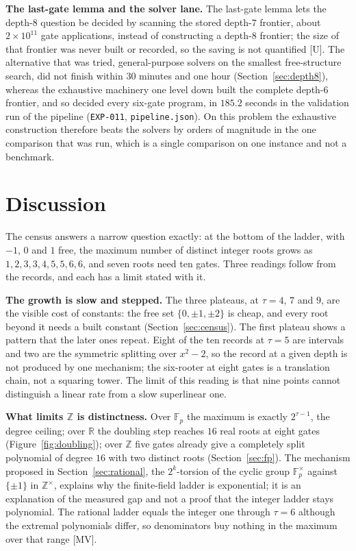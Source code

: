 \documentclass[11pt]{article}
\theoremstyle{definition}
\theoremstyle{remark}
\newcommand{\Z}{\mathbb{Z}}
\begin{document}
\textbf{The last-gate lemma and the solver lane.} The last-gate lemma lets the depth-$8$ question
be decided by scanning the stored depth-$7$ frontier, about $2 \times 10^{11}$ gate applications, instead of
constructing a depth-$8$ frontier; the size of that frontier was never built or recorded, so the saving
is not quantified [U]. The alternative that was tried, general-purpose solvers on the smallest
free-structure search, did not finish within $30$ minutes and one hour (Section~\ref{sec:depth8}), whereas
the exhaustive machinery one level down built the complete depth-$6$ frontier, and so decided
every six-gate program, in $185.2$ seconds in the validation run of the pipeline (\texttt{EXP-011},
\texttt{pipeline.json}). On this problem the exhaustive construction therefore beats the solvers by
orders of magnitude in the one comparison that was run, which is a single comparison on one
instance and not a benchmark.

\section{Discussion}\label{sec:discussion}

The census answers a narrow question exactly: at the bottom of the ladder, with $-1$, $0$ and $1$ free,
the maximum number of distinct integer roots grows as $1,2,3,3,4,5,5,6,6$, and seven roots need ten
gates. Three readings follow from the records, and each has a limit stated with it.

\textbf{The growth is slow and stepped.} The three plateaus, at $\tau = 4$, $7$ and $9$, are the visible
cost of constants: the free set $\{0,\pm1,\pm2\}$ is cheap, and every root beyond it needs a built
constant (Section~\ref{sec:census}). The first plateau shows a pattern that
the later ones repeat. Eight of the ten records at $\tau = 5$ are intervals and two are the symmetric
splitting over $x^2 - 2$, so the record at a given depth is not produced by one mechanism; the six-rooter at eight gates
is a translation chain, not a squaring tower. The limit of this reading is that nine points
cannot distinguish a linear rate from a slow superlinear one.

\textbf{What limits $\Z$ is distinctness.} Over $\mathbb{F}_p$ the maximum is exactly $2^{\tau-1}$,
the degree ceiling; over $\mathbb{R}$ the doubling step reaches $16$ real roots at eight gates
(Figure~\ref{fig:doubling}); over $\Z$ five gates already give a completely split polynomial of degree
$16$ with two distinct roots (Section~\ref{sec:fp}). The mechanism proposed
in Section~\ref{sec:rational}, the $2^k$-torsion of the cyclic group $\mathbb{F}_p^{\times}$ against
$\{\pm1\}$ in $\Z^{\times}$, explains why the finite-field ladder is exponential; it is an
explanation of the measured gap and not a proof that the integer ladder stays polynomial.
The rational ladder equals the integer one through $\tau = 6$ although the extremal polynomials differ,
so denominators buy nothing in the maximum over that range [MV].
\end{document}

